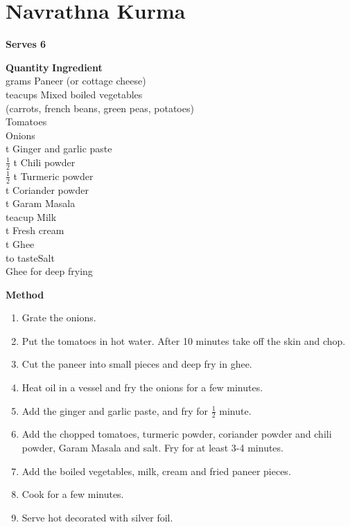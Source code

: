 \section{Navrathna Kurma}
{\bf Serves  6}
\begin{tabbing}
\hspace{1.0cm}  \={\bf Quantity}   \hspace{3.0cm} \={\bf Ingredient}\\
 grams \>Paneer (or cottage cheese)\\
 teacups \>Mixed boiled vegetables\\
\>\>(carrots, french beans, green peas, potatoes)\\
 \>Tomatoes\\
 \>Onions\\
 t\> Ginger and garlic paste\\
$\frac{1}{2}$ t \>Chili powder\\
\>$\frac{1}{2}$ t \>Turmeric powder\\
 t \>Coriander powder\\
 t \>Garam Masala\\
 teacup \>Milk\\
 t \>Fresh cream\\
 t \>Ghee \\
\>to taste\>Salt\\
\>\>Ghee for deep frying\\
\end{tabbing}

{\bf Method}
\begin{enumerate}
\item Grate the onions.
\item Put the tomatoes in hot water. After 10 minutes take off the skin and chop.
\item Cut the paneer into small pieces and deep fry in ghee.
\item Heat oil in a vessel and fry the onions for a few minutes.
\item Add the ginger and garlic paste, and fry for $\frac{1}{2}$ minute.
\item Add the chopped tomatoes, turmeric powder, coriander powder and chili powder, 
Garam Masala and salt. Fry for at least 3-4 minutes.
\item Add the boiled vegetables, milk, cream and fried paneer pieces.
\item Cook for a few minutes.
\item Serve hot decorated with silver foil.
\end{enumerate}

